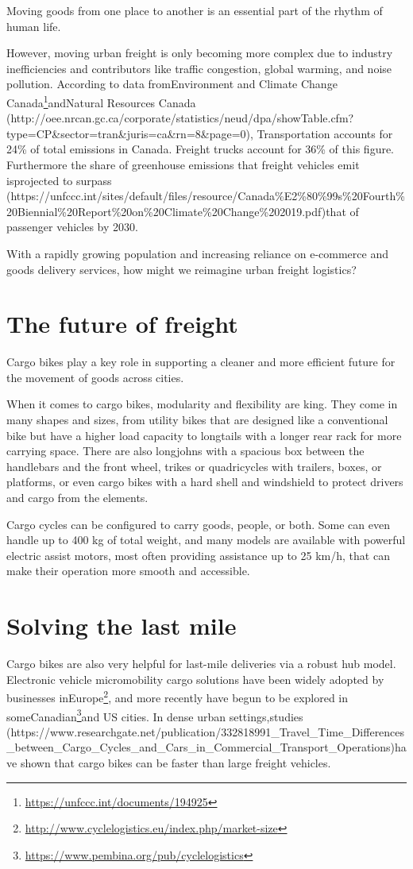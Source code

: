 \documentclass[letter]{ourGreenwayBrand}
\begin{document}
\MakeBrandTitle

Moving goods from one place to another is an essential part of the rhythm of human life.

However, moving urban freight is only becoming more complex due to industry inefficiencies and contributors like traffic congestion, global warming, and noise pollution. According to data fromEnvironment and Climate Change Canada\footnote{\url{https://unfccc.int/documents/194925}}andNatural Resources Canada (http://oee.nrcan.gc.ca/corporate/statistics/neud/dpa/showTable.cfm?type=CP\&sector=tran\&juris=ca\&rn=8\&page=0), Transportation accounts for 24\% of total emissions in Canada. Freight trucks account for 36\% of this figure. Furthermore the share of greenhouse emissions that freight vehicles emit isprojected to surpass (https://unfccc.int/sites/default/files/resource/Canada\%E2\%80\%99s\%20Fourth\%20Biennial\%20Report\%20on\%20Climate\%20Change\%202019.pdf)that of passenger vehicles by 2030.

With a rapidly growing population and increasing reliance on e-commerce and goods delivery services, how might we reimagine urban freight logistics?

\section{The future of freight}
Cargo bikes play a key role in supporting a cleaner and more efficient future for the movement of goods across cities.

When it comes to cargo bikes, modularity and flexibility are king. They come in many shapes and sizes, from utility bikes that are designed like a conventional bike but have a higher load capacity to longtails with a longer rear rack for more carrying space. There are also longjohns with a spacious box between the handlebars and the front wheel, trikes or quadricycles with trailers, boxes, or platforms, or even cargo bikes with a hard shell and windshield to protect drivers and cargo from the elements.

Cargo cycles can be configured to carry goods, people, or both. Some can even handle up to 400 kg of total weight, and many models are available with powerful electric assist motors, most often providing assistance up to 25 km/h, that can make their operation more smooth and accessible.

\section{Solving the last mile}
Cargo bikes are also very helpful for last-mile deliveries via a robust hub model. Electronic vehicle micromobility cargo solutions have been widely adopted by businesses inEurope\footnote{\url{http://www.cyclelogistics.eu/index.php/market-size}}, and more recently have begun to be explored in someCanadian\footnote{\url{https://www.pembina.org/pub/cyclelogistics}}and US cities. In dense urban settings,studies (https://www.researchgate.net/publication/332818991\_Travel\_Time\_Differences\_between\_Cargo\_Cycles\_and\_Cars\_in\_Commercial\_Transport\_Operations)have shown that cargo bikes can be faster than large freight vehicles.
\end{document}
